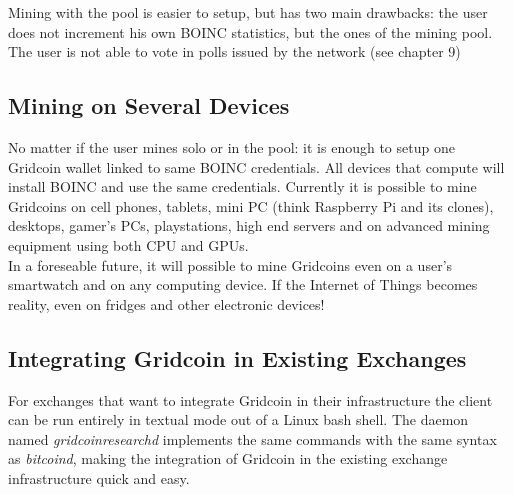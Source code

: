 Mining with the pool is easier to setup, but has two main drawbacks: the user does not increment his own BOINC statistics, but the ones of the  mining pool. The user is not able to vote in polls issued by the network (see chapter 9)

\subsection{Mining on Several Devices}

No matter if the user mines solo or in the pool: it is enough to setup one Gridcoin wallet linked to same BOINC credentials. All devices that compute will install BOINC and use the same credentials. Currently it is possible to mine Gridcoins on cell phones, tablets, mini PC (think Raspberry Pi and its clones), desktops, gamer's PCs, playstations, high end servers and on advanced mining equipment using both CPU and GPUs.\\

In a foreseable future, it will possible to mine Gridcoins even on a user's smartwatch and on any computing device. If the Internet of Things becomes reality, even on fridges and other electronic devices!

\subsection{Integrating Gridcoin in Existing Exchanges}

For exchanges that want to integrate Gridcoin in their infrastructure the client can be run entirely in textual mode out of a Linux bash shell. The daemon named \textit{gridcoinresearchd} implements the same commands with the same syntax as \textit{bitcoind}, making the integration of Gridcoin in the existing exchange infrastructure quick and easy.\\
